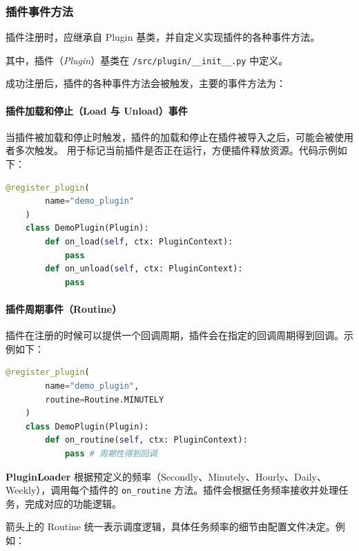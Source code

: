 \documentclass[14pt,a4paper,UTF8,twoside]{article}
\begin{document}
\newpage{} %

\subsubsection{插件事件方法}

\begin{mdframed}

插件注册时，应继承自 Plugin 基类，并自定义实现插件的各种事件方法。

其中，插件（\textit{Plugin}）基类在 \verb`/src/plugin/__init__.py` 中定义。
\end{mdframed}

成功注册后，插件的各种事件方法会被触发，主要的事件方法为：

\paragraph{插件加载和停止（Load 与 Unload）事件}

当插件被加载和停止时触发，插件的加载和停止在插件被导入之后，可能会被使用者多次触发。
用于标记当前插件是否正在运行，方便插件释放资源。代码示例如下：

\begin{lstlisting}[language=python, title = 插件加载和停止示例]
    @register_plugin(
        name="demo_plugin"
    )
    class DemoPlugin(Plugin):
        def on_load(self, ctx: PluginContext):
            pass
        def on_unload(self, ctx: PluginContext):
            pass
\end{lstlisting}

\paragraph{插件周期事件（Routine）}\label{para:routine}
插件在注册的时候可以提供一个回调周期，插件会在指定的回调周期得到回调。示例如下：

\begin{lstlisting}[language=python, title= 周期事件示例]
    @register_plugin(
        name="demo_plugin",
        routine=Routine.MINUTELY
    )
    class DemoPlugin(Plugin):
        def on_routine(self, ctx: PluginContext):
            pass # 周期性得到回调
\end{lstlisting}

\begin{note}
\noindent \textbf{PluginLoader} 根据预定义的频率（Secondly、Minutely、Hourly、Daily、Weekly），调用每个插件的 \texttt{on\_routine} 方法。插件会根据任务频率接收并处理任务，完成对应的功能逻辑。

\vspace{0.3cm}

\noindent 箭头上的 Routine 统一表示调度逻辑，具体任务频率的细节由配置文件决定。例如：
\end{note}
\end{document}
